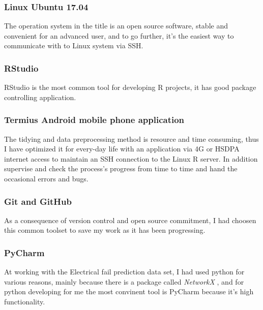 			\subsubsection{Linux Ubuntu 17.04}
The operation system in the title is an open source software, stable and convenient for an advanced user, and to go further, it's the easiest way to communicate with to Linux system via SSH.
\cite{Ubuntu}
			\subsubsection{RStudio}
RStudio is the most common tool for developing R projects, it has good package controlling application.
\cite{RStudio}
			\subsubsection{Termius Android mobile phone application}
The tidying and data preprocessing method is resource and time consuming, thus I have optimized it for every-day life with an application via 4G or HSDPA internet access to maintain an SSH connection to the Linux R server. In addition supervise and check the process's progress from time to time and hand the occasional errors and bugs.
\cite{Termius}
			\subsubsection{Git and GitHub}
As a consequence of version control and open source commitment, I had choosen this common toolset to save my work as it has been progressing.
\cite{Github}
			\subsubsection{PyCharm}
At working with the Electrical fail prediction data set, I had used python for various reasons, mainly because there is a package called \textit{NetworkX} \cite{NetworkX}, and for python developing for me the most convinent tool is PyCharm because it's high functionality.
\cite{PyCharm}	
